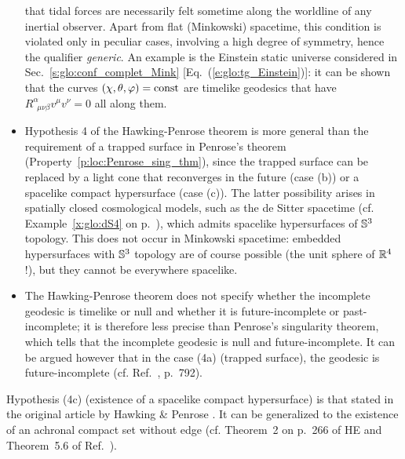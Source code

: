 \begin{itemize}
that tidal forces are necessarily felt sometime along the worldline of any inertial observer. Apart from flat (Minkowski) spacetime, this condition is violated only in peculiar cases,
involving a high degree of symmetry, hence the qualifier \emph{generic}. An example is the Einstein static universe considered in Sec.~\ref{s:glo:conf_complet_Mink} [Eq.~(\ref{e:glo:tg_Einstein})]:
it can be shown \cite{Senov98} that the curves $(\chi,\theta,\varphi) = \mathrm{const}$ are timelike geodesics that have $R^\alpha_{\ \; \mu\nu\beta} v^\mu v^\nu  = 0$ all along them.
\item Hypothesis 4 of the Hawking-Penrose theorem is more general than the requirement of
a trapped surface in Penrose's theorem (Property~\ref{p:loc:Penrose_sing_thm}), since the
trapped surface can be replaced by a light cone that reconverges in the future
(case (b)) or a spacelike compact hypersurface (case (c)). The latter possibility arises
in spatially closed cosmological models, such as the de Sitter spacetime
(cf. Example~\ref{x:glo:dS4} on p.~\pageref{x:glo:dS4}), which admits spacelike hypersurfaces of $\mathbb{S}^3$ topology. This does not occur in Minkowski spacetime: embedded hypersurfaces with $\mathbb{S}^3$ topology
are of course possible (the unit sphere of $\mathbb{R}^4$ !), but they cannot be everywhere spacelike.
\item The Hawking-Penrose theorem does not specify whether the incomplete geodesic is timelike or
null and whether it is future-incomplete or past-incomplete; it is therefore less precise
than Penrose's singularity theorem, which tells that the incomplete geodesic is null and future-incomplete.
It can be argued however that in the case (4a) (trapped surface), the geodesic is
future-incomplete (cf.  Ref.~\cite{Senov98}, p.~792).
\end{itemize}

\begin{remark}
Hypothesis (4c) (existence of a spacelike compact hypersurface) is
that stated in the original article by Hawking \& Penrose \cite{HawkiP70}.
It can be generalized to the existence of an achronal compact set without
edge (cf. Theorem~2 on p.~266 of HE \cite{HawkiE73} and Theorem~5.6 of Ref.~\cite{Senov98}).
\end{remark}


